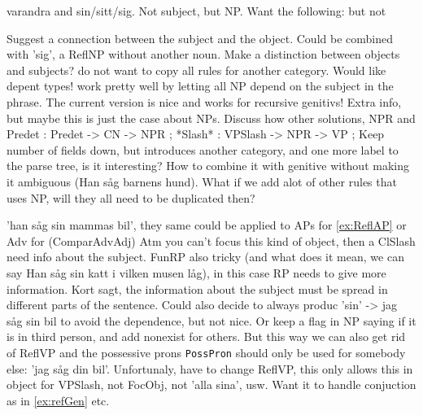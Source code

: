 varandra and sin/sitt/sig. Not subject, but NP.
Want the following:
but not
\label{ex:refGen}
\label{ex:ReflAP}

Suggest a connection between the subject and the object.
Could be combined with 'sig', a ReflNP without another noun.
Make a distinction between objects and subjects?
do not want to copy all rules for another category. Would like depent types!
work pretty well by letting all NP depend on the subject in the phrase.
The current version is nice and works for recursive genitivs!
Extra info, but maybe this is just the case about NPs.
Discuss how other solutions, NPR and Predet : Predet -> CN -> NPR ;
*Slash* : VPSlash -> NPR -> VP ;
Keep number of fields down, but introduces another category, and one more
label to the parse tree, is it interesting? How to combine it with genitive 
without making it ambiguous (Han såg barnens hund).
What if we add alot of other rules that uses NP, will they all need to be
duplicated then?

'han såg sin mammas bil', they same could be applied to
APs for \ref{ex:ReflAP} or Adv for
 (ComparAdvAdj)
Atm you can't focus this kind of object, then a ClSlash need info about the
subject. FunRP also tricky (and what does it mean, we can say
Han såg sin katt i vilken musen låg), in this case RP needs to give more information.
Kort sagt, the information about the subject must be spread
in different parts of the sentence. 
Could also decide to always produc 'sin' -> jag såg sin bil
to avoid the dependence, but not nice. Or keep a flag in NP saying if it is
in third person, and add nonexist for others. But this way we can also get rid
of ReflVP and the possessive prons \verb|PossPron| should only be used for somebody else:
'jag såg din bil'.
Unfortunaly, have to change ReflVP, this only allows this in object for VPSlash, not FocObj,
not 'alla sina', usw. Want it to handle conjuction as in \ref{ex:refGen}
etc.


